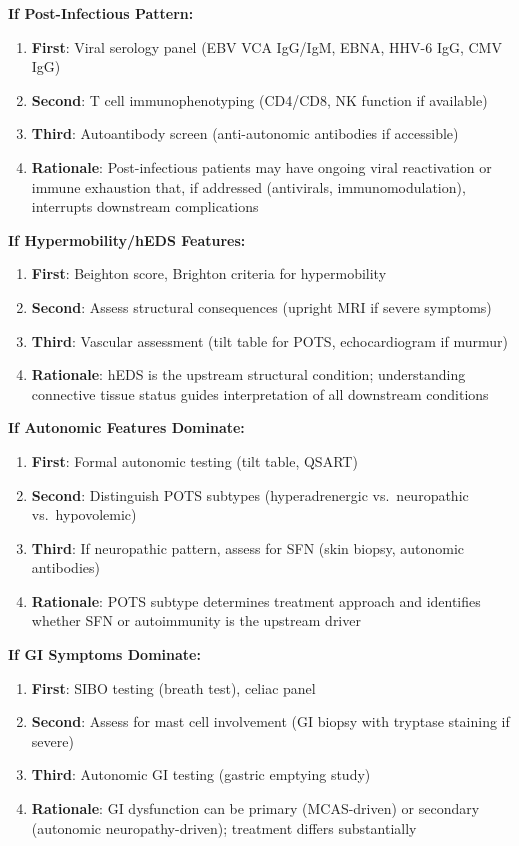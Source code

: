 \textbf{If Post-Infectious Pattern:}
\begin{enumerate}
    \item \textbf{First}: Viral serology panel (EBV VCA IgG/IgM, EBNA, HHV-6 IgG, CMV IgG)
    \item \textbf{Second}: T cell immunophenotyping (CD4/CD8, NK function if available)
    \item \textbf{Third}: Autoantibody screen (anti-autonomic antibodies if accessible)
    \item \textbf{Rationale}: Post-infectious patients may have ongoing viral reactivation or immune exhaustion that, if addressed (antivirals, immunomodulation), interrupts downstream complications
\end{enumerate}

\textbf{If Hypermobility/hEDS Features:}
\begin{enumerate}
    \item \textbf{First}: Beighton score, Brighton criteria for hypermobility
    \item \textbf{Second}: Assess structural consequences (upright MRI if severe symptoms)
    \item \textbf{Third}: Vascular assessment (tilt table for POTS, echocardiogram if murmur)
    \item \textbf{Rationale}: hEDS is the upstream structural condition; understanding connective tissue status guides interpretation of all downstream conditions
\end{enumerate}

\textbf{If Autonomic Features Dominate:}
\begin{enumerate}
    \item \textbf{First}: Formal autonomic testing (tilt table, QSART)
    \item \textbf{Second}: Distinguish POTS subtypes (hyperadrenergic vs.\ neuropathic vs.\ hypovolemic)
    \item \textbf{Third}: If neuropathic pattern, assess for SFN (skin biopsy, autonomic antibodies)
    \item \textbf{Rationale}: POTS subtype determines treatment approach and identifies whether SFN or autoimmunity is the upstream driver
\end{enumerate}

\textbf{If GI Symptoms Dominate:}
\begin{enumerate}
    \item \textbf{First}: SIBO testing (breath test), celiac panel
    \item \textbf{Second}: Assess for mast cell involvement (GI biopsy with tryptase staining if severe)
    \item \textbf{Third}: Autonomic GI testing (gastric emptying study)
    \item \textbf{Rationale}: GI dysfunction can be primary (MCAS-driven) or secondary (autonomic neuropathy-driven); treatment differs substantially
\end{enumerate}

